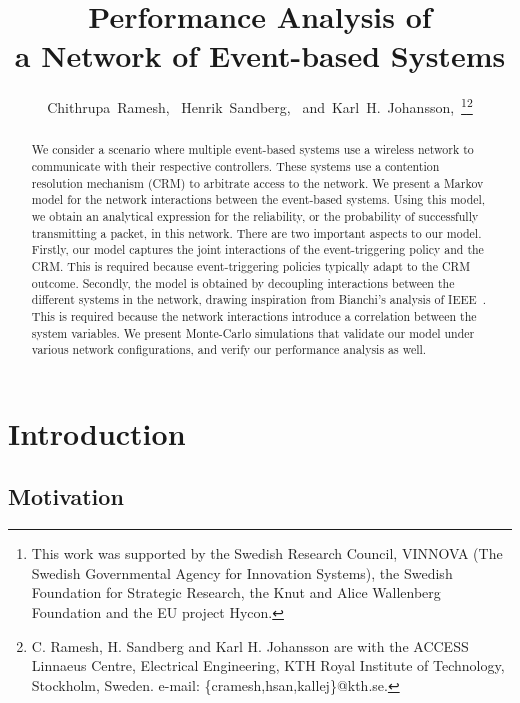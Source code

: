\documentclass[journal]{IEEEtran}
\begin{document}
\title{Performance Analysis of \\
a Network of Event-based Systems}
\author{Chithrupa~Ramesh,~
        Henrik~Sandberg,~
        and~Karl~H.~Johansson,~\thanks{This work was supported by the Swedish Research Council,
        VINNOVA (The Swedish Governmental Agency for Innovation
        Systems), the Swedish Foundation for Strategic Research,
        the Knut and Alice Wallenberg Foundation and the EU
        project Hycon.}\thanks{C. Ramesh, H. Sandberg and Karl H. Johansson are with the ACCESS Linnaeus Centre,
Electrical Engineering, KTH Royal Institute of Technology, Stockholm,
Sweden. e-mail: \{cramesh,hsan,kallej\}@kth.se.}}
\maketitle


\begin{abstract}

We consider a scenario where multiple event-based systems use a wireless network to communicate with their respective controllers. These systems use a contention resolution mechanism (CRM) to arbitrate access to the network. We present a Markov model for the network interactions between the event-based systems. Using this model, we obtain an analytical expression for the reliability, or the probability of successfully transmitting a packet, in this network. There are two important aspects to our model. Firstly, our model captures the joint interactions of the event-triggering policy and the CRM. This is required because event-triggering policies typically adapt to the CRM outcome. Secondly, the model is obtained by decoupling interactions between the different systems in the network, drawing inspiration from Bianchi's analysis of IEEE~. This is required because the network interactions introduce a correlation between the system variables. We present Monte-Carlo simulations that validate our model under various network configurations, and verify our performance analysis as well.

\end{abstract}

\section{Introduction} \label{S:Intro}

\subsection{Motivation}
\end{document}
